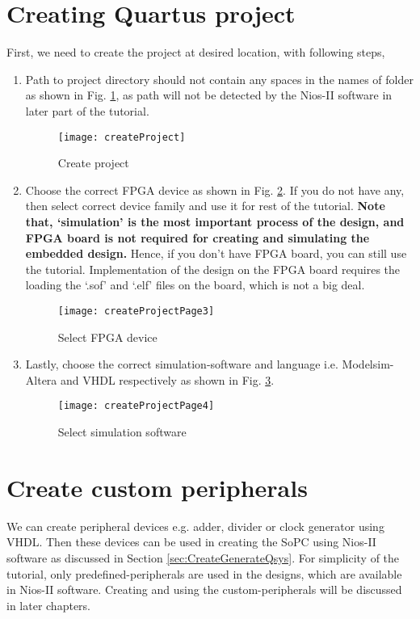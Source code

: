 \section{Creating Quartus project} \label{sec:CreateQuartusProject}
First, we need to create the project at desired location, with following steps, 
\begin{enumerate}
	\item Path to project directory should not contain any spaces in the names of folder as shown in Fig. \ref{fig:createProject}, as path will not be detected by the Nios-II software in later part of the tutorial. 
	\begin{figure}[!h]
		\centering
		\texttt{[image: createProject]}
		\caption{Create project}
		\label{fig:createProject}
	\end{figure}
	
	\item Choose the correct FPGA device as shown in Fig. \ref{fig:createProjectPage3}. If you do not have any, then select correct device family and use it for rest of the tutorial. \textbf{Note that, `simulation' is the most important process of the design, and FPGA board is not required for creating and simulating the embedded design.} Hence, if you don't have FPGA board, you can still use the tutorial. Implementation of the design on the FPGA board requires the loading the `.sof' and `.elf' files on the board, which is not a big deal.  
	\begin{figure}[!h]
		\centering
		\texttt{[image: createProjectPage3]}
		\caption{Select FPGA device}
		\label{fig:createProjectPage3}
	\end{figure}
	
	\item Lastly, choose the correct simulation-software and language  i.e. Modelsim-Altera and VHDL respectively as shown in Fig. \ref{fig:createProjectPage4}.
	\begin{figure}[!h]
		\centering
		\texttt{[image: createProjectPage4]}
		\caption{Select simulation software}
		\label{fig:createProjectPage4}
	\end{figure}
\end{enumerate}


\section{Create custom peripherals}
We can create peripheral devices e.g. adder, divider or clock generator using VHDL. Then these devices can be used in creating the SoPC using Nios-II software as discussed in Section \ref{sec:CreateGenerateQsys}. For simplicity of the tutorial, only predefined-peripherals are used in the designs, which are available in Nios-II software. Creating and using the custom-peripherals will be discussed in later chapters. 


